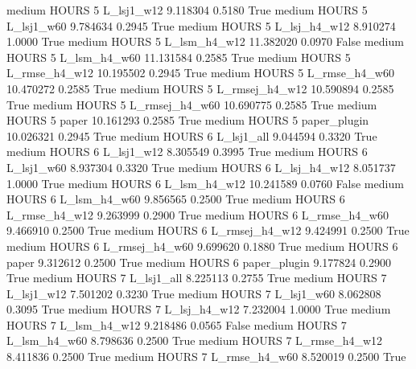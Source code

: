     medium    HOURS                 5     L_lsj1_w12   9.118304      0.5180    True
    medium    HOURS                 5     L_lsj1_w60   9.784634      0.2945    True
    medium    HOURS                 5   L_lsj_h4_w12   8.910274      1.0000    True
    medium    HOURS                 5   L_lsm_h4_w12  11.382020      0.0970   False
    medium    HOURS                 5   L_lsm_h4_w60  11.131584      0.2585    True
    medium    HOURS                 5  L_rmse_h4_w12  10.195502      0.2945    True
    medium    HOURS                 5  L_rmse_h4_w60  10.470272      0.2585    True
    medium    HOURS                 5 L_rmsej_h4_w12  10.590894      0.2585    True
    medium    HOURS                 5 L_rmsej_h4_w60  10.690775      0.2585    True
    medium    HOURS                 5          paper  10.161293      0.2585    True
    medium    HOURS                 5   paper_plugin  10.026321      0.2945    True
    medium    HOURS                 6     L_lsj1_all   9.044594      0.3320    True
    medium    HOURS                 6     L_lsj1_w12   8.305549      0.3995    True
    medium    HOURS                 6     L_lsj1_w60   8.937304      0.3320    True
    medium    HOURS                 6   L_lsj_h4_w12   8.051737      1.0000    True
    medium    HOURS                 6   L_lsm_h4_w12  10.241589      0.0760   False
    medium    HOURS                 6   L_lsm_h4_w60   9.856565      0.2500    True
    medium    HOURS                 6  L_rmse_h4_w12   9.263999      0.2900    True
    medium    HOURS                 6  L_rmse_h4_w60   9.466910      0.2500    True
    medium    HOURS                 6 L_rmsej_h4_w12   9.424991      0.2500    True
    medium    HOURS                 6 L_rmsej_h4_w60   9.699620      0.1880    True
    medium    HOURS                 6          paper   9.312612      0.2500    True
    medium    HOURS                 6   paper_plugin   9.177824      0.2900    True
    medium    HOURS                 7     L_lsj1_all   8.225113      0.2755    True
    medium    HOURS                 7     L_lsj1_w12   7.501202      0.3230    True
    medium    HOURS                 7     L_lsj1_w60   8.062808      0.3095    True
    medium    HOURS                 7   L_lsj_h4_w12   7.232004      1.0000    True
    medium    HOURS                 7   L_lsm_h4_w12   9.218486      0.0565   False
    medium    HOURS                 7   L_lsm_h4_w60   8.798636      0.2500    True
    medium    HOURS                 7  L_rmse_h4_w12   8.411836      0.2500    True
    medium    HOURS                 7  L_rmse_h4_w60   8.520019      0.2500    True
